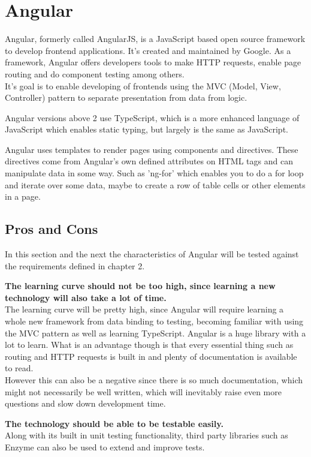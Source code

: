 \documentclass{report}
\begin{document}
	\chapter{Angular}
	Angular, formerly called AngularJS, is a JavaScript based open source framework to develop frontend applications. It's created and maintained by Google. As a framework, Angular offers developers tools to make HTTP requests, enable page routing and do component testing among others.\\
	It's goal is to enable developing of frontends using the MVC (Model, View, Controller) pattern to separate presentation from data from logic.
	
	Angular versions above 2 use TypeScript, which is a more enhanced language of JavaScript which enables static typing, but largely is the same as JavaScript.
	
	Angular uses templates to render pages using components and directives. These directives come from Angular's own defined attributes on HTML tags and can manipulate data in some way. Such as 'ng-for' which enables you to do a for loop and iterate over some data, maybe to create a row of table cells or other elements in a page.
	
	\section{Pros and Cons}
	In this section and the next the characteristics of Angular will be tested against the requirements defined in chapter 2.
	
	\textbf{The learning curve should not be too high, since learning a new technology will also take a lot of time.} \\
	The learning curve will be pretty high, since Angular will require learning a whole new framework from data binding to testing, becoming familiar with using the MVC pattern as well as learning TypeScript. Angular is a huge library with a lot to learn. What is an advantage though is that every essential thing such as routing and HTTP requests is built in and plenty of documentation is available to read. \\
	However this can also be a negative since there is so much documentation, which might not necessarily be well written, which will inevitably raise even more questions and slow down development time.
	
	\textbf{The technology should be able to be testable easily.} \\
	Along with its built in unit testing functionality, third party libraries such as Enzyme can also be used to extend and improve tests.
	
\end{document}
